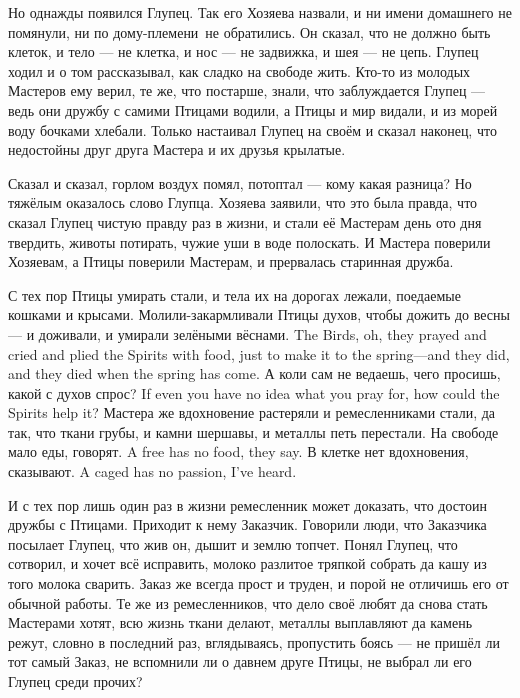Но однажды появился Глупец.
Так его Хозяева назвали, и ни имени домашнего не помянули, ни по дому-племени\FM\ не обратились.
Он сказал, что не должно быть клеток, и тело --- не клетка, и нос --- не задвижка, и шея --- не цепь.
Глупец ходил и о том рассказывал, как сладко на свободе жить.
Кто-то из молодых Мастеров ему верил, те же, что постарше, знали, что заблуждается Глупец --- ведь они дружбу с самими Птицами водили, а Птицы и мир видали, и из морей воду бочками хлебали.
Только настаивал Глупец на своём и сказал наконец, что недостойны друг друга Мастера и их друзья крылатые.

Сказал и сказал, горлом воздух помял, потоптал --- кому какая разница?
Но тяжёлым оказалось слово Глупца.
Хозяева заявили, что это была правда, что сказал Глупец чистую правду раз в жизни, и стали её Мастерам день ото дня твердить, животы потирать, чужие уши в воде полоскать.
И Мастера поверили Хозяевам, а Птицы поверили Мастерам, и прервалась старинная дружба.

С тех пор Птицы умирать стали, и тела их на дорогах лежали, поедаемые кошками и крысами.
{Молили-закармливали Птицы духов, чтобы дожить до весны --- и доживали, и умирали зелёными вёснами.}
{The Birds, oh, they prayed and cried and plied the Spirits with food, just to make it to the spring---and they did, and they died when the spring has come.}
{А коли сам не ведаешь, чего просишь, какой с духов спрос?}
{If even you have no idea what you pray for, how could the Spirits help it?}
Мастера же вдохновение растеряли и ремесленниками стали, да так, что ткани грубы, и камни шершавы, и металлы петь перестали.
{На свободе мало еды, говорят.}
{A free has no food, they say.}
{В клетке нет вдохновения, сказывают.}
{A caged has no passion, I've heard.}

И с тех пор лишь один раз в жизни ремесленник может доказать, что достоин дружбы с Птицами.
Приходит к нему Заказчик.
Говорили люди, что Заказчика посылает Глупец, что жив он, дышит и землю топчет.
Понял Глупец, что сотворил, и хочет всё исправить, молоко разлитое тряпкой собрать да кашу из того молока сварить.
Заказ же всегда прост и труден, и порой не отличишь его от обычной работы.
Те же из ремесленников, что дело своё любят да снова стать Мастерами хотят, всю жизнь ткани делают, металлы выплавляют да камень режут, словно в последний раз, вглядываясь, пропустить боясь --- не пришёл ли тот самый Заказ, не вспомнили ли о давнем друге Птицы, не выбрал ли его Глупец среди прочих?

